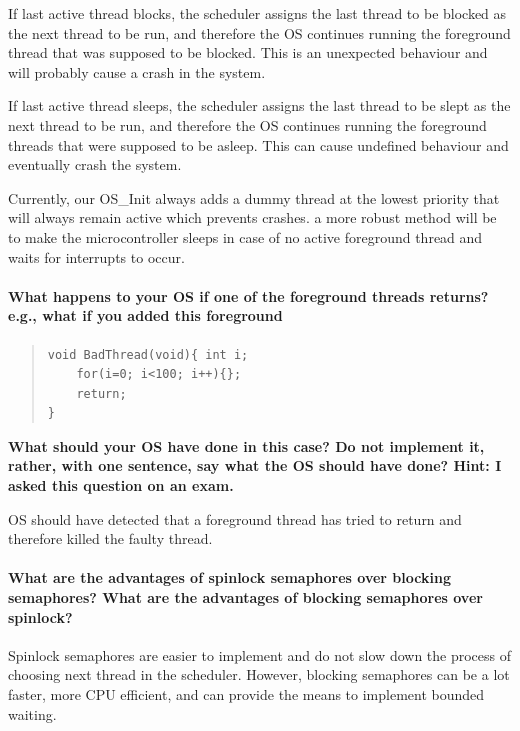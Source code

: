 \documentclass[a4paper]{article}
\begin{document}
If last active thread blocks, the scheduler assigns the last thread to be blocked as the next thread to be run, and therefore the OS continues running the foreground thread that was supposed to be blocked. This is an unexpected behaviour and will probably cause a crash in the system.

If last active thread sleeps, the scheduler assigns the last thread to be slept as the next thread to be run, and therefore the OS continues running the foreground threads that were supposed to be asleep. This can cause undefined behaviour and eventually crash the system.

Currently, our OS\_Init always adds a dummy thread at the lowest priority that will always remain active which prevents crashes. a more robust method will be to make the microcontroller sleeps in case of no active foreground thread and waits for interrupts to occur.
 
\paragraph{What happens to your OS if one of the foreground threads returns? e.g., what if you added this
foreground\\[5pt] } 

\begin{quote}
\vspace{-25pt}
\lstset{language=C, frame=none, numbers=none}
\begin{lstlisting}
void BadThread(void){ int i; 
 	for(i=0; i<100; i++){}; 
 	return; 
}
\end{lstlisting}
\end{quote}
\vspace{-30pt}
\textbf{What should your OS have done in this case? Do not implement it, rather, with one sentence, say what the OS 
should have done? Hint: I asked this question on an exam. }

OS should have detected that a foreground thread has tried to return and therefore killed the faulty thread.
 
\paragraph{What are the advantages of spinlock semaphores over blocking semaphores? What are the advantages of 
blocking semaphores over spinlock? \\}
 
Spinlock semaphores are easier to implement and do not slow down the process of choosing next thread in the scheduler. However, blocking semaphores can be a lot faster, more CPU efficient, and can provide the means to implement bounded waiting.
 
\end{document}
